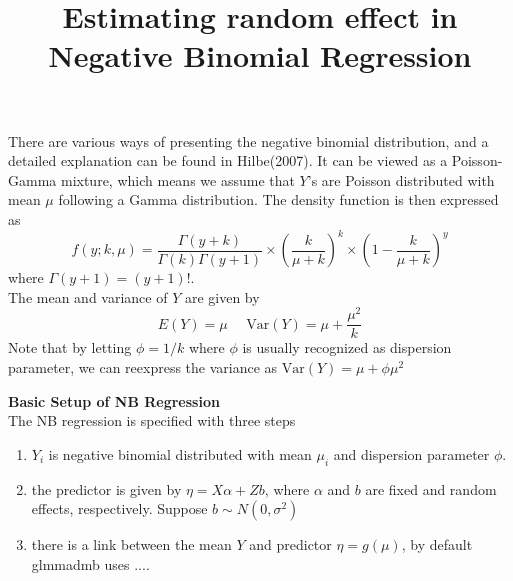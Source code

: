 \documentclass[paper=a4, fontsize=12.5pt]{scrartcl} %
\title{Estimating random effect in Negative Binomial Regression}
\date{} %
\numberwithin{equation}{section} %
\numberwithin{figure}{section} %
\numberwithin{table}{section} %
\begin{document}
\maketitle
There are various ways of presenting the negative binomial distribution, and a detailed explanation can be found in Hilbe(2007). It can be viewed as a Poisson-Gamma mixture, which means we assume that $Y$'s are Poisson distributed with mean $\mu$ following a Gamma distribution. The density function is then expressed as
\[f(y; k,\mu)=\frac{\Gamma(y+ k)}{\Gamma(k)\Gamma(y + 1)}\times \left(\frac{k}{\mu + k }\right)^k\times\left(1- \frac{k}{\mu + k }\right)^y\]
where $\Gamma(y+1)=(y+1)!$.\\ The mean and variance of $Y$ are given by
\[E(Y)= \mu  ~~~~~~\text{Var}(Y)=\mu + \frac{\mu^2}{k}\]
Note that by letting $\phi= 1/k$ where $\phi$ is usually recognized as dispersion parameter,  we can reexpress the variance as $\text{Var}(Y)= \mu + \phi\mu^2$

\textbf{ Basic Setup of NB Regression}\\
The NB regression is specified with three steps
\begin{enumerate}
  \item $Y_i$ is negative binomial distributed with mean $\mu_i$ and dispersion parameter $\phi$.
  \item the predictor is given by $\eta = X\alpha + Zb$, where $\alpha$ and $b$ are fixed and random effects, respectively. Suppose $b\sim N(0, \sigma^2)$
  \item there is a link between the mean $Y$ and predictor $\eta = g(\mu)$, by default glmmadmb uses ....
\end{enumerate}
\end{document}
